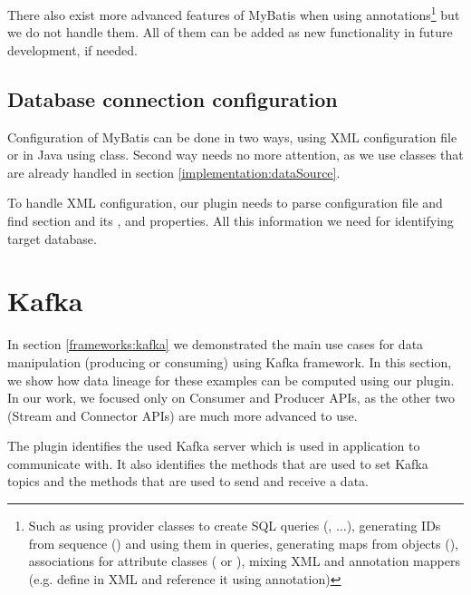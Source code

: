

There also exist more advanced features of MyBatis when using annotations\footnote{
  Such as using provider classes to create SQL queries (, $\ldots$),
  generating IDs from sequence () and using them in queries,
  generating maps from objects (),
  associations for attribute classes ( or ),
  mixing XML and annotation mappers (e.g. define  in XML and reference it
  using  annotation)}
but we do not handle them. All of them can be added as new functionality in future development,
if needed.




\subsection{Database connection configuration}

Configuration of MyBatis can be done in two ways, using XML configuration file
or in Java using  class. Second way needs no more attention,
as we use  classes that are already handled in section \ref{implementation:dataSource}.

To handle XML configuration, our plugin needs to parse configuration file and find 
section and its ,  and  properties. All this
information we need for identifying target database.




\section{Kafka}

In section \ref{frameworks:kafka} we demonstrated the main use cases
for data manipulation (producing or consuming) using Kafka framework.
In this section, we show how data lineage for these examples can be computed
using our plugin. In our work, we focused only on Consumer and Producer APIs,
as the other two (Stream and Connector APIs) are much more advanced to use.

The plugin identifies the used Kafka server which is used in application to communicate with.
It also identifies the methods that are used to set Kafka topics
and the methods that are used to send and receive a data.

